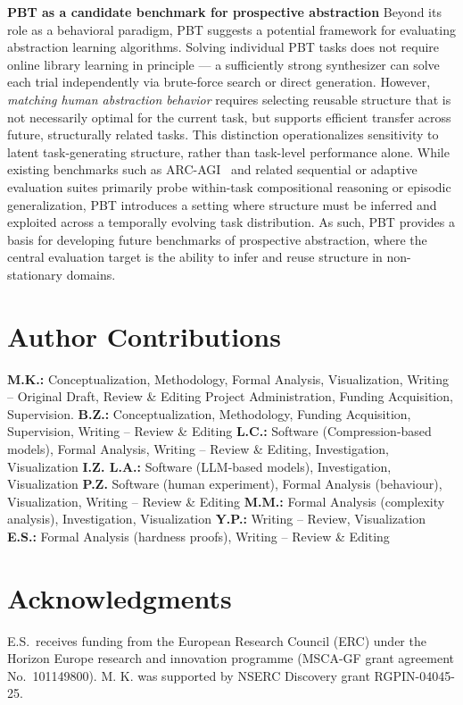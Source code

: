 \documentclass{article}
\begin{document}
\textbf{PBT as a candidate benchmark for prospective abstraction}
Beyond its role as a behavioral paradigm, PBT suggests a potential framework for evaluating abstraction learning algorithms. Solving individual PBT tasks does not require online library learning in principle --- a sufficiently strong synthesizer can solve each trial independently via brute-force search or direct generation. However, \emph{matching human abstraction behavior} requires selecting reusable structure that is not necessarily optimal for the current task, but supports efficient transfer across future, structurally related tasks. This distinction operationalizes sensitivity to latent task-generating structure, rather than task-level performance alone. While existing benchmarks such as ARC-AGI~\citep{chollet2019measure} and related sequential or adaptive evaluation suites primarily probe within-task compositional reasoning or episodic generalization, PBT introduces a setting where structure must be inferred and exploited across a temporally evolving task distribution. As such, PBT provides a basis for developing future benchmarks of prospective abstraction, where the central evaluation target is the ability to infer and reuse structure in non-stationary domains.

\section*{Author Contributions}
\textbf{M.K.:} Conceptualization, Methodology, Formal Analysis, Visualization, Writing -- Original Draft, Review \& Editing
Project Administration, Funding Acquisition, Supervision.
\textbf{B.Z.:} Conceptualization, Methodology, Funding Acquisition, Supervision, Writing -- Review \& Editing
\textbf{L.C.:} Software (Compression-based models), Formal Analysis, Writing -- Review \& Editing, Investigation, Visualization
\textbf{I.Z. L.A.:} Software (LLM-based models), Investigation, Visualization
\textbf{P.Z.} Software (human experiment), Formal Analysis (behaviour), Visualization, Writing -- Review \& Editing
\textbf{M.M.:} Formal Analysis (complexity analysis), Investigation, Visualization
\textbf{Y.P.:} Writing -- Review, Visualization
\textbf{E.S.:} Formal Analysis (hardness proofs), Writing -- Review \& Editing

\section{Acknowledgments}
E.S.\ receives funding from the European Research Council (ERC) under the Horizon Europe research and innovation programme (MSCA-GF grant agreement No.\ 101149800). M. K. was supported by NSERC Discovery grant RGPIN-04045-25.
\end{document}

